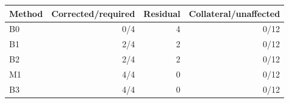 \begin{tabular}{lrrr}
\toprule
Method & Corrected/required & Residual & Collateral/unaffected \\
\midrule
B0 & 0/4 & 4 & 0/12 \\
B1 & 2/4 & 2 & 0/12 \\
B2 & 2/4 & 2 & 0/12 \\
M1 & 4/4 & 0 & 0/12 \\
B3 & 4/4 & 0 & 0/12 \\
\bottomrule
\end{tabular}

